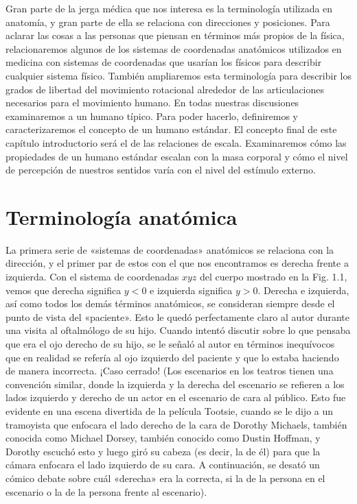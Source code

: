 \documentclass[12pt]{book}
\begin{document}
Gran parte de la jerga médica que nos interesa es la terminología utilizada en anatomía, y gran parte de ella se relaciona con direcciones y posiciones. Para aclarar las cosas a las personas que piensan en términos más propios de la física, relacionaremos algunos de los sistemas de coordenadas anatómicos utilizados en medicina con sistemas de coordenadas que usarían los físicos para describir cualquier sistema físico. También ampliaremos esta terminología para describir los grados de libertad del movimiento rotacional alrededor de las articulaciones necesarios para el movimiento humano. En todas nuestras discusiones examinaremos a un humano típico. Para poder hacerlo, definiremos y caracterizaremos el concepto de un humano estándar. El concepto final de este capítulo introductorio será el de las relaciones de escala. Examinaremos cómo las propiedades de un humano estándar escalan con la masa corporal y cómo el nivel de percepción de nuestros sentidos varía con el nivel del estímulo externo.

\section{Terminología anatómica}

La primera serie de «sistemas de coordenadas» anatómicos se relaciona con la dirección, y el primer par de estos con el que nos encontramos es derecha frente a izquierda. Con el sistema de coordenadas $x y z$ del cuerpo mostrado en la Fig. 1.1, vemos que derecha significa $y < 0$ e izquierda significa $y > 0$. Derecha e izquierda, así como todos los demás términos anatómicos, se consideran siempre desde el punto de vista del «paciente». Esto le quedó perfectamente claro al autor durante una visita al oftalmólogo de su hijo. Cuando intentó discutir sobre lo que pensaba que era el ojo derecho de su hijo, se le señaló al autor en términos inequívocos que en realidad se refería al ojo izquierdo del paciente y que lo estaba haciendo de manera incorrecta. ¡Caso cerrado! (Los escenarios en los teatros tienen una convención similar, donde la izquierda y la derecha del escenario se refieren a los lados izquierdo y derecho de un actor en el escenario de cara al público. Esto fue evidente en una escena divertida de la película Tootsie, cuando se le dijo a un tramoyista que enfocara el lado derecho de la cara de Dorothy Michaels, también conocida como Michael Dorsey, también conocido como Dustin Hoffman, y Dorothy escuchó esto y luego giró su cabeza (es decir, la de él) para que la cámara enfocara el lado izquierdo de su cara. A continuación, se desató un cómico debate sobre cuál «derecha» era la correcta, si la de la persona en el escenario o la de la persona frente al escenario).
\end{document}
